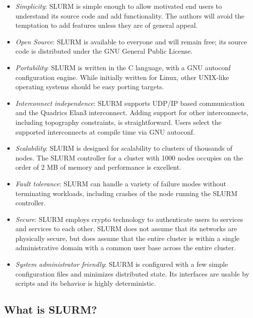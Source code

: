 \begin{itemize}
\item {\em Simplicity}: SLURM is simple enough to allow motivated end users
to understand its source code and add functionality.  The authors will 
avoid the temptation to add features unless they are of general appeal. 

\item {\em Open Source}: SLURM is available to everyone and will remain free;
its source code is distributed under the GNU General Public License.

\item {\em Portability}: SLURM is written in the C language, with a GNU 
autoconf configuration engine.  While initially written for Linux, 
other UNIX-like operating systems should be easy porting targets.

\item {\em Interconnect independence}: SLURM supports UDP/IP based
communication and the Quadrics Elan3 interconnect.  Adding support for other
interconnects, including topography constraints, is straightforward.  
Users select the supported interconnects at compile time via GNU autoconf.

\item {\em Scalability}: SLURM is designed for scalability to clusters of
thousands of nodes.
The SLURM controller for a cluster with 1000 nodes occupies on the 
order of 2 MB of memory and performance is excellent. 

\item {\em Fault tolerance}: SLURM can handle a variety of failure modes
without terminating workloads, including crashes of the node running the SLURM
controller.

\item {\em Secure}: SLURM employs crypto technology to authenticate 
users to services and services to each other.  
SLURM does not assume that its networks are physically secure, 
but does assume that the entire cluster is within a single 
administrative domain with a common user base across the 
entire cluster.

\item {\em System administrator friendly}: SLURM is configured with a few
simple configuration files and minimizes distributed state.  Its interfaces
are usable by scripts and its behavior is highly deterministic.

\end{itemize}

\subsection{What is SLURM?}

